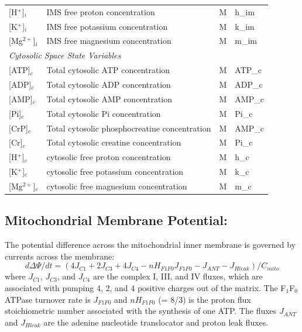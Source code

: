 \documentclass[fleqn,10pt]{physiome}
\begin{document}
\begin{table}[ht]
\begin{tabular}{l l l l}
{[H$^+$]}$_i$     & IMS free proton concentration    & M  & h\_im \\
{[K$^+$]}$_i$     & IMS free potassium concentration & M  & k\_im \\
{[Mg$^{2+}$]}$_i$ & IMS free magnesium concentration & M  & m\_im \\
\multicolumn{4}{l}{\em Cytosolic Space State Variables} \\
{[ATP]}$_c$       & Total cytosolic ATP concentration      & M  & ATP\_c \\
{[ADP]}$_c$       & Total cytosolic ADP concentration      & M  & ADP\_c \\
{[AMP]}$_c$       & Total cytosolic AMP concentration      & M  & AMP\_c \\
{[Pi]}$_c$        & Total cytosolic Pi concentration       & M  & Pi\_c \\
{[CrP]}$_c$       & Total cytosolic phosphocreatine concentration & M  & AMP\_c \\
{[Cr]}$_c$        & Total cytosolic creatine concentration        & M  & Pi\_c \\
{[H$^+$]}$_c$     & cytosolic free proton concentration    & M  & h\_c \\
{[K$^+$]}$_c$     & cytosolic free potassium concentration & M  & k\_c \\
{[Mg$^{2+}$]}$_c$ & cytosolic free magnesium concentration & M  & m\_c \\
\bottomrule
\end{tabular}
\end{table}

\subsection{Mitochondrial Membrane Potential:}

The potential difference across the mitochondrial inner membrane is governed by currents across the membrane:
\begin{equation}\label{eq:1}
  d\Delta\Psi / dt = \left( 4J_{C1} + 2J_{C3} + 4J_{C4} - nH_{F1F0} J_{F1F0} - J_{ANT} - J_{Hleak} \right) / C_{mito}
\end{equation}
where $J_{C1}$, $J_{C3}$, and $J_{C4}$ are the complex I, III, and IV fluxes, which are associated with pumping 4, 2, and 4 positive charges out of the matrix. The F$_1$F$_0$ ATPase turnover rate is $J_{F1F0}$ and $nH_{F1F0}$ (= 8/3) is the proton flux stoichiometric number associated with the synthesis of one ATP. The fluxes $J_{ANT}$ and $J_{Hleak} $ are the adenine nucleotide translocator and proton leak fluxes. 
\end{document}

